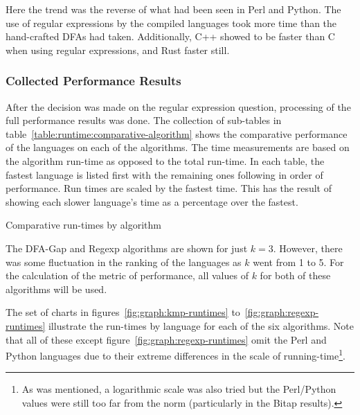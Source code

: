 Here the trend was the reverse of what had been seen in Perl and Python. The use of regular expressions by the compiled languages took more time than the hand-crafted DFAs had taken. Additionally, C++ showed to be faster than C when using regular expressions, and Rust faster still.

\subsubsection{Collected Performance Results}

After the decision was made on the regular expression question, processing of the full performance results was done. The collection of sub-tables in table~\ref{table:runtime:comparative-algorithm} shows the comparative performance of the languages on each of the algorithms. The time measurements are based on the algorithm run-time as opposed to the total run-time. In each table, the fastest language is listed first with the remaining ones following in order of performance. Run times are scaled by the fastest time. This has the result of showing each slower language's time as a percentage over the fastest.

\begin{table}[!htb]

\caption{Comparative run-times by algorithm}
\label{table:runtime:comparative-algorithm}
\end{table}

The DFA-Gap and Regexp algorithms are shown for just $k=3$. However, there was some fluctuation in the ranking of the languages as $k$ went from 1 to 5. For the calculation of the metric of performance, all values of $k$ for both of these algorithms will be used.

The set of charts in figures~\ref{fig:graph:kmp-runtimes} to~\ref{fig:graph:regexp-runtimes} illustrate the run-times by language for each of the six algorithms. Note that all of these except figure~\ref{fig:graph:regexp-runtimes} omit the Perl and Python languages due to their extreme differences in the scale of running-time\footnote{As was mentioned, a logarithmic scale was also tried but the Perl/Python values were still too far from the norm (particularly in the Bitap results).}.

